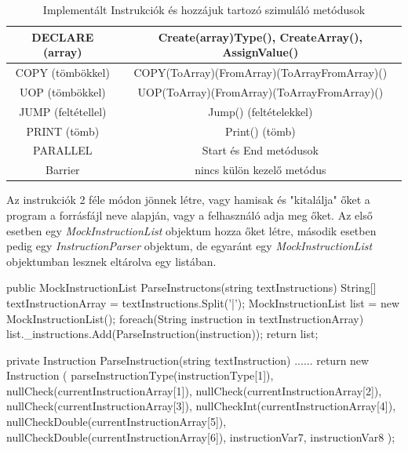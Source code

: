 \begin{table}[h!]
\centering
\caption{Implementált Instrukciók és hozzájuk tartozó szimuláló metódusok}
\label{tab:instru}
\begin{tabular}{|c|c|}
\hline
DECLARE (array) & Create(array)Type(), CreateArray(), AssignValue()  \\
\hline
COPY (tömbökkel) & COPY(ToArray)(FromArray)(ToArrayFromArray)() \\
\hline
UOP (tömbökkel) & UOP(ToArray)(FromArray)(ToArrayFromArray)() \\
\hline
JUMP (feltétellel) & Jump() (feltételekkel)\\
\hline 
PRINT (tömb) & Print() (tömb) \\
\hline
PARALLEL & Start és End metódusok \\
\hline
Barrier & nincs külön kezelő metódus \\
\hline
\end{tabular}
\end{table}

Az instrukciók 2 féle módon jönnek létre, vagy hamisak és "kitalálja" őket a program a forrásfájl neve alapján, vagy a felhasználó adja meg őket. Az első esetben egy \textit{MockInstructionList} objektum hozza őket létre, második esetben pedig egy \textit{InstructionParser} objektum, de egyaránt egy \textit{MockInstructionList} objektumban lesznek eltárolva egy listában.

\begin{cpp}
public MockInstructionList ParseInstructons(string textInstructions)
{
    String[] textInstructionArray = textInstructions.Split('|');
    MockInstructionList list = new MockInstructionList();
    foreach(String instruction in textInstructionArray)
    {         
        list._instructions.Add(ParseInstruction(instruction));
    }
    return list;
}
        
private Instruction ParseInstruction(string textInstruction)
{
    ......
    return  new Instruction
	(
		parseInstructionType(instructionType[1]),
        nullCheck(currentInstructionArray[1]),
        nullCheck(currentInstructionArray[2]),
        nullCheck(currentInstructionArray[3]), 
        nullCheckInt(currentInstructionArray[4]),
        nullCheckDouble(currentInstructionArray[5]),
        nullCheckDouble(currentInstructionArray[6]),
        instructionVar7,
        instructionVar8
	);
}
\end{cpp}





